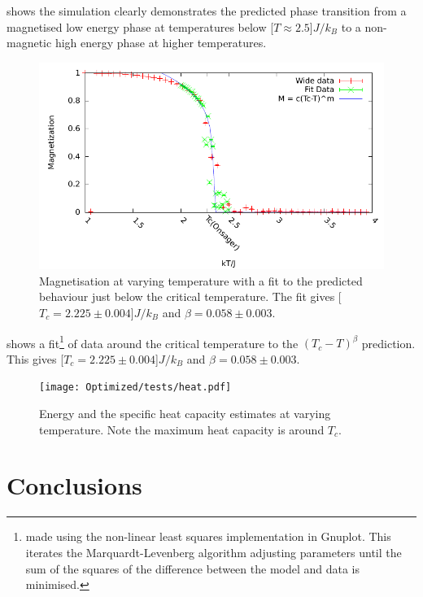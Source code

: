 \documentclass[12pt,a4paper,english]{article}
\begin{document}
 shows the simulation clearly demonstrates the predicted phase transition from a magnetised low energy phase at temperatures below \unit[$T\approx2.5$]{$J/k_B$} to a non-magnetic high energy phase at higher temperatures.

\begin{figure}
\center
\includegraphics[width=\textwidth]{Optimized/tests/detail.pdf}
\caption{Magnetisation at varying temperature with a fit to the predicted behaviour just below the critical temperature. The fit gives \unit[$T_c=2.225\pm0.004$]{$J/k_B$} and $\beta=0.058\pm0.003$.}\label{fig:detail}
\end{figure}

 shows a fit\footnote{made using the non-linear least squares implementation in Gnuplot.  This iterates the Marquardt-Levenberg algorithm adjusting parameters until the sum of the squares of the difference between the model and data is minimised.} of data around the critical temperature to the $\left( T_c - T\right)^\beta$ prediction.  This gives \unit[$T_c=2.225\pm0.004$]{$J/k_B$} and $\beta=0.058\pm0.003$. 

\begin{figure}
\center
\texttt{[image: Optimized/tests/heat.pdf]}
\caption{Energy and the specific heat capacity estimates at varying temperature. Note the maximum heat capacity is around $T_c$.}\label{fig:heat}
\end{figure}

\section{Conclusions}
\label{sec:conclusions}



\end{document}
